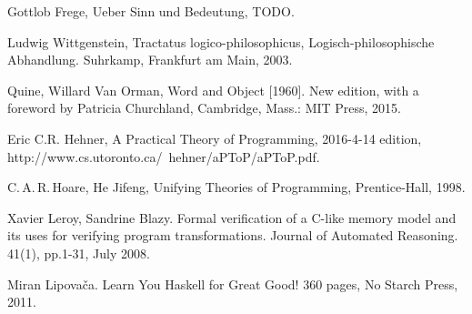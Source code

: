 \documentclass{article}
\theoremstyle{definition}
\begin{document}
\begin{thebibliography}{00}

  Gottlob Frege,
  Ueber Sinn und Bedeutung,
  TODO.

  Ludwig Wittgenstein,
  Tractatus logico-philosophicus, Logisch-phi\-lo\-so\-phi\-sche Abhandlung.
  Suhrkamp,
  Frankfurt am Main,
  2003.

  Quine, Willard Van Orman,
  Word and Object [1960].
  New edition, with a foreword by Patricia Churchland,
  Cambridge,
  Mass.: MIT Press,
  2015.

  Eric C.R. Hehner,
  A Practical Theory of Programming,
  2016-4-14 edition,
  http://www.cs.utoronto.ca/~hehner/aPToP/aPToP.pdf.

  C.\,A.\,R.\,Hoare, He Jifeng,
  Unifying Theories of Programming,
  Prentice-Hall,
  1998.

  Xavier Leroy, Sandrine Blazy.
  Formal verification of a C-like memory model and its uses for verifying program transformations.
  Journal of Automated Reasoning.
  41(1), pp.1-31, July 2008.

  Miran Lipova\v{c}a.
  Learn You Haskell for Great Good!
  360 pages,
  No Starch Press,
  2011.

\end{thebibliography}
\end{document}
